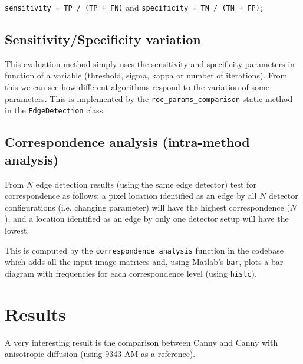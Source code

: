 \documentclass{article}
\begin{document}
	\begin{center}
	\verb|sensitivity = TP / (TP + FN)| and \verb|specificity = TN / (TN + FP);|
	\end{center}
	
	\subsection*{Sensitivity/Specificity variation}	
	
	This evaluation method simply uses the sensitivity and specificity parameters in function
	of a variable (threshold, sigma, kappa or number of iterations). From this we
	can see how different algorithms respond to the variation of some parameters.
	This is implemented by the \verb|roc_params_comparison| static method in the
	\verb|EdgeDetection| class.
	
	\subsection*{Correspondence analysis (intra-method analysis)}	
	
	From $N$ edge detection results (using the same edge detector) test for
	correspondence as follows: a pixel location identified as an edge by
	all $N$ detector configurations (i.e. changing parameter)
	will have the highest correspondence ($N$), and a
	location identified as an edge by only one detector setup will have the lowest.
	
	This is computed by the \verb|correspondence_analysis| function in the codebase which
	adds all the input image matrices and, using Matlab's \verb|bar|, plots a bar diagram
	with frequencies for each correspondence level (using \verb|histc|).
	
	\section{Results}
	
	A very interesting result is the comparison between Canny and Canny with anisotropic diffusion (using 9343 AM as a reference).
\end{document}
